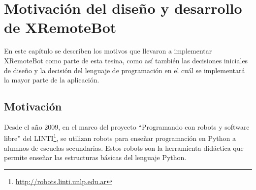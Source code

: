 \chapter{Motivación del diseño y desarrollo de XRemoteBot}\label{cha:motivacion}

En este capítulo se describen los motivos que llevaron a implementar XRemoteBot
como
parte de esta tesina, como así también las decisiones
iniciales de
diseño y la decisión del lenguaje de programación en el cuál se implementará
la mayor
parte de la aplicación.


\section{Motivación}\label{sec:motivacion}
Desde el año 2009, en el marco del proyecto ``Programando con robots y
software libre'' del LINTI\footnote{\url{http://robots.linti.unlp.edu.ar}},
se utilizan robots para enseñar programación en Python a alumnos de escuelas
secundarias. Estos robots son la herramienta didáctica que permite enseñar
las estructuras básicas del lenguaje Python.



